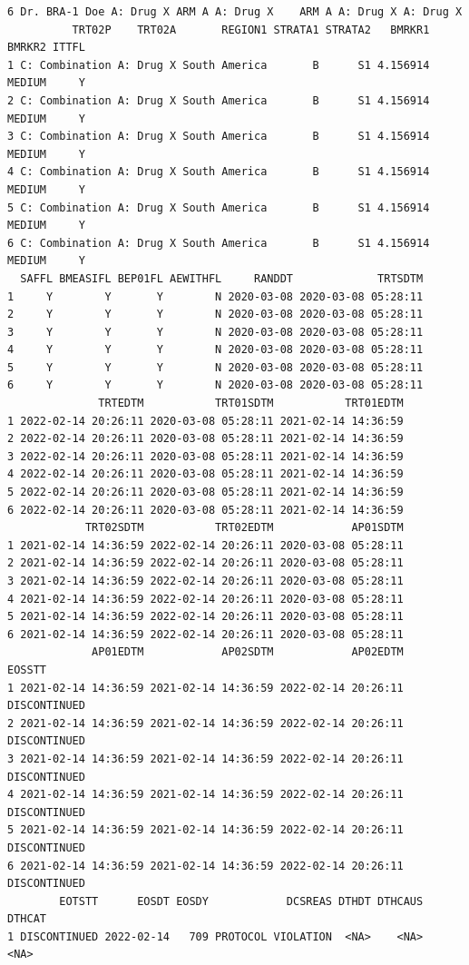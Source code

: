 \documentclass[
  letterpaper,
  DIV=11,
  numbers=noendperiod]{scrreprt}
\begin{document}
\begin{tcolorbox}[enhanced jigsaw, leftrule=.75mm, arc=.35mm, colback=white, colframe=quarto-callout-note-color-frame, opacityback=0, toprule=.15mm, bottomrule=.15mm, rightrule=.15mm, left=2mm, breakable]
\begin{minipage}[t]{\textwidth - 5.5mm}
\begin{verbatim}
6 Dr. BRA-1 Doe A: Drug X ARM A A: Drug X    ARM A A: Drug X A: Drug X
          TRT02P    TRT02A       REGION1 STRATA1 STRATA2   BMRKR1 BMRKR2 ITTFL
1 C: Combination A: Drug X South America       B      S1 4.156914 MEDIUM     Y
2 C: Combination A: Drug X South America       B      S1 4.156914 MEDIUM     Y
3 C: Combination A: Drug X South America       B      S1 4.156914 MEDIUM     Y
4 C: Combination A: Drug X South America       B      S1 4.156914 MEDIUM     Y
5 C: Combination A: Drug X South America       B      S1 4.156914 MEDIUM     Y
6 C: Combination A: Drug X South America       B      S1 4.156914 MEDIUM     Y
  SAFFL BMEASIFL BEP01FL AEWITHFL     RANDDT             TRTSDTM
1     Y        Y       Y        N 2020-03-08 2020-03-08 05:28:11
2     Y        Y       Y        N 2020-03-08 2020-03-08 05:28:11
3     Y        Y       Y        N 2020-03-08 2020-03-08 05:28:11
4     Y        Y       Y        N 2020-03-08 2020-03-08 05:28:11
5     Y        Y       Y        N 2020-03-08 2020-03-08 05:28:11
6     Y        Y       Y        N 2020-03-08 2020-03-08 05:28:11
              TRTEDTM           TRT01SDTM           TRT01EDTM
1 2022-02-14 20:26:11 2020-03-08 05:28:11 2021-02-14 14:36:59
2 2022-02-14 20:26:11 2020-03-08 05:28:11 2021-02-14 14:36:59
3 2022-02-14 20:26:11 2020-03-08 05:28:11 2021-02-14 14:36:59
4 2022-02-14 20:26:11 2020-03-08 05:28:11 2021-02-14 14:36:59
5 2022-02-14 20:26:11 2020-03-08 05:28:11 2021-02-14 14:36:59
6 2022-02-14 20:26:11 2020-03-08 05:28:11 2021-02-14 14:36:59
            TRT02SDTM           TRT02EDTM            AP01SDTM
1 2021-02-14 14:36:59 2022-02-14 20:26:11 2020-03-08 05:28:11
2 2021-02-14 14:36:59 2022-02-14 20:26:11 2020-03-08 05:28:11
3 2021-02-14 14:36:59 2022-02-14 20:26:11 2020-03-08 05:28:11
4 2021-02-14 14:36:59 2022-02-14 20:26:11 2020-03-08 05:28:11
5 2021-02-14 14:36:59 2022-02-14 20:26:11 2020-03-08 05:28:11
6 2021-02-14 14:36:59 2022-02-14 20:26:11 2020-03-08 05:28:11
             AP01EDTM            AP02SDTM            AP02EDTM       EOSSTT
1 2021-02-14 14:36:59 2021-02-14 14:36:59 2022-02-14 20:26:11 DISCONTINUED
2 2021-02-14 14:36:59 2021-02-14 14:36:59 2022-02-14 20:26:11 DISCONTINUED
3 2021-02-14 14:36:59 2021-02-14 14:36:59 2022-02-14 20:26:11 DISCONTINUED
4 2021-02-14 14:36:59 2021-02-14 14:36:59 2022-02-14 20:26:11 DISCONTINUED
5 2021-02-14 14:36:59 2021-02-14 14:36:59 2022-02-14 20:26:11 DISCONTINUED
6 2021-02-14 14:36:59 2021-02-14 14:36:59 2022-02-14 20:26:11 DISCONTINUED
        EOTSTT      EOSDT EOSDY            DCSREAS DTHDT DTHCAUS DTHCAT
1 DISCONTINUED 2022-02-14   709 PROTOCOL VIOLATION  <NA>    <NA>   <NA>

\end{verbatim}
\end{minipage}
\end{tcolorbox}
\end{document}
